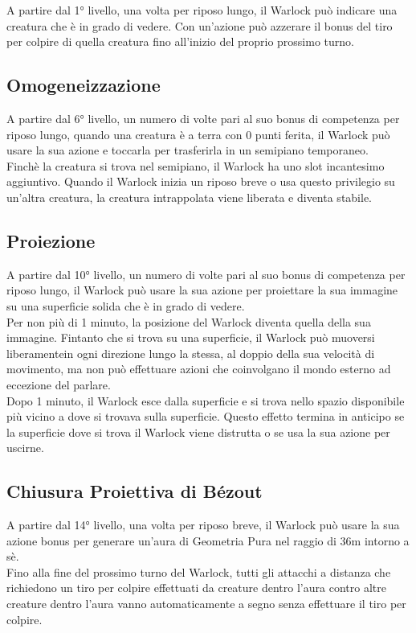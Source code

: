 A partire dal 1° livello, una volta per riposo lungo, il Warlock può indicare una creatura che è in grado di vedere. Con un'azione può azzerare il bonus del tiro per colpire di quella creatura fino all'inizio del proprio prossimo turno.

\subsection{Omogeneizzazione}

A partire dal 6° livello, un numero di volte pari al suo bonus di competenza per riposo lungo, quando una creatura è a terra con 0 punti ferita, il Warlock può usare la sua azione e toccarla per trasferirla in un semipiano temporaneo. \\ Finchè la creatura si trova nel semipiano, il Warlock ha uno slot incantesimo aggiuntivo. Quando il Warlock inizia un riposo breve o usa questo privilegio su un'altra creatura, la creatura intrappolata viene liberata e diventa stabile.

\subsection{Proiezione}

A partire dal 10° livello, un numero di volte pari al suo bonus di competenza per riposo lungo, il Warlock può usare la sua azione per proiettare la sua immagine su una superficie solida che è in grado di vedere. \\ Per non più di 1 minuto, la posizione del Warlock diventa quella della sua immagine. Fintanto che si trova su una superficie, il Warlock può muoversi liberamentein ogni direzione lungo la stessa, al doppio della sua velocità di movimento, ma non può effettuare azioni che coinvolgano il mondo esterno ad eccezione del parlare. \\ Dopo 1 minuto, il Warlock esce dalla superficie e si trova nello spazio disponibile più vicino a dove si trovava sulla superficie. Questo effetto termina in anticipo se la superficie dove si trova il Warlock viene distrutta o se usa la sua azione per uscirne.

\subsection{Chiusura Proiettiva di Bézout}

A partire dal 14° livello, una volta per riposo breve, il Warlock può usare la sua azione bonus per generare un'aura di Geometria Pura nel raggio di 36m intorno a sè. \\ Fino alla fine del prossimo turno del Warlock, tutti gli attacchi a distanza che richiedono un tiro per colpire effettuati da creature dentro l'aura contro altre creature dentro l'aura vanno automaticamente a segno senza effettuare il tiro per colpire.

